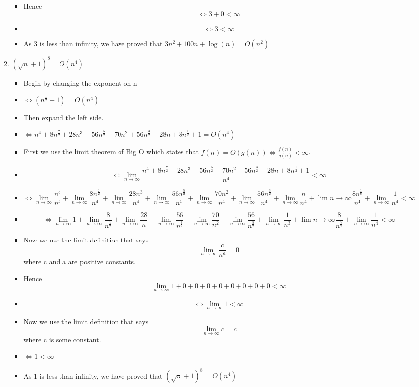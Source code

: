 \documentclass{article}
\begin{document}
\begin{enumerate}
\begin{enumerate}
\begin{itemize}
    \item [] Hence {\Large $$\Leftrightarrow 3 + 0 < \infty$$}
    \item [] {\Large $$\Leftrightarrow 3 < \infty$$}
    \item As 3 is less than infinity, we have proved that $3n^{2} + 100n + \log{(n)} = O(n^{2})$
    \end{itemize}
  \item $(\sqrt{n} +1)^{8} = O(n^{4})$
    \begin{itemize}
    \item [] Begin by changing the exponent on n
    \item [] {\Large{$\Leftrightarrow (n^{\frac{1}{2}} +1)=O(n^{4})$}}
    \item [] Then expand the left side.
    \item [] {\Large{$\Leftrightarrow n^{4} + 8n^{\frac{7}{2}} +28n^{3} +56n^{\frac{5}{2}} + 70n^{2} +56n^{\frac{3}{2}} +28n +8n^{\frac{1}{2}} +1 = O(n^{4})$}}
    \item [] First we use the limit theorem of Big O which states that $f(n)=O(g(n)) \Leftrightarrow \frac{f(n)}{g(n)} < \infty$.
    \item [] {\Large{$$\Leftrightarrow \lim_{n \to \infty} \frac{n^{4} + 8n^{\frac{7}{2}} +28n^{3} +56n^{\frac{5}{2}} + 70n^{2} +56n^{\frac{3}{2}} +28n +8n^{\frac{1}{2}} +1}{n^{4}} < \infty$$}}
    \item [] $$\Leftrightarrow \lim_{n \to \infty} \frac{n^{4}}{n^{4}} + \lim_{n \to \infty} \frac{8n^{\frac{7}{2}}}{n^{4}} + \lim_{n \to \infty} \frac{28n^{3}}{n^{4}} + \lim_{n \to \infty} \frac{56n^{\frac{5}{2}}}{n^{4}} + \lim_{n \to \infty} \frac{70n^{2}}{n^{4}} + \lim_{n \to \infty} \frac{56n^{\frac{3}{2}}}{n^{4}} + \lim_{n \to \infty} \frac{n}{n^{4}} + \lim{n \to \infty} \frac{8n^{\frac{1}{8}}}{n^{4}} + \lim_{n \to \infty} \frac{1}{n^{4}} < \infty$$
    \item [] $$\Leftrightarrow \lim_{n \to \infty} 1 + \lim_{n \to \infty} \frac{8}{n^{\frac{1}{2}}} + \lim_{n \to \infty} \frac{28}{n} + \lim_{n \to \infty} \frac{56}{n^{\frac{3}{2}}} + \lim_{n \to \infty} \frac{70}{n^{2}} + \lim_{n \to \infty} \frac{56}{n^{\frac{5}{2}}} + \lim_{n \to \infty} \frac{1}{n^{3}} + \lim{n \to \infty} \frac{8}{n^{\frac{7}{2}}} + \lim_{n \to \infty} \frac{1}{n^{4}} < \infty$$
    \item [] Now we use the limit definition that says {\Large $$\lim_{n \to \infty} \frac{c}{n^{a}} =0$$} where c and a are positive constants.
    \item [] Hence {\Large{$$\lim_{n \to \infty} 1 +0+0+0+0+0+0+0+0 < \infty$$}}
    \item [] {\Large{$$\Leftrightarrow \lim_{n \to \infty} 1 < \infty$$}}
    \item [] Now we use the limit definition that says $$\lim_{n \to \infty} c = c$$ where c is some constant.
    \item [] $\Leftrightarrow 1 < \infty$
    \item As 1 is less than infinity, we have proved that $(\sqrt{n} +1)^{8} =O(n^{4})$
    \end{itemize}
  \end{enumerate}


\end{enumerate}
\end{document}
